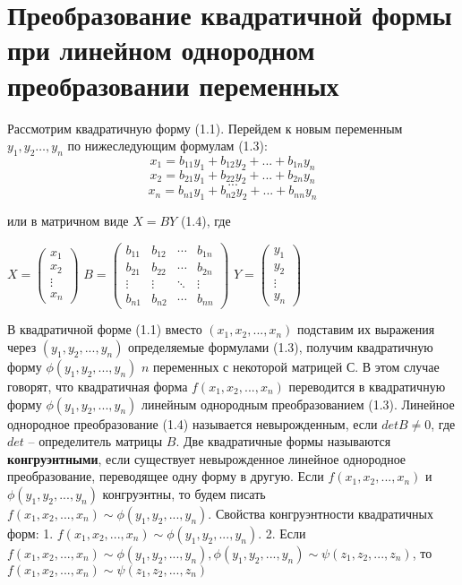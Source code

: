 \documentclass[bachelor, och, coursework, times]{SCWorks}
\newcommand\tab[1][1cm]{\hspace*{#1}}
\newcommand{\tl}{\newline\tab}
\begin{document}
\section{Преобразование квадратичной формы при линейном однородном преобразовании переменных}
\tab Рассмотрим квадратичную форму (1.1). Перейдем к новым переменным $y_1, y_2…,y_n$ по нижеследующим формулам (1.3):
$$x_1=b_{11}y_1+b_{12}y_2+...+b_{1n}y_n$$
$$x_2=b_{21}y_1+b_{22}y_2+...+b_{2n}y_n$$
$$...$$
$$x_n=b_{n1}y_1+b_{n2}y_2+...+b_{nn}y_n$$

или в матричном виде $X=BY$ (1.4), где  \newline
\begin{center}
$X = \begin{pmatrix}
x_{1}  \\
x_{2} \\        
\vdots \\
x_{n}
\end{pmatrix}$
$B = \begin{pmatrix}
b_{11} & b_{12} & \cdots & b_{1n} \\
b_{21} & b_{22} & \cdots & b_{2n} \\        
\vdots & \vdots & \ddots & \vdots \\
b_{n1} & b_{n2} & \cdots & b_{nn}
\end{pmatrix}$
$Y = \begin{pmatrix}
y_{1}  \\
y_{2} \\        
\vdots \\
y_{n}
\end{pmatrix}$
\end{center}
\tab
В квадратичной форме (1.1) вместо $(x_1, x_2,...,x_n)$ подставим их выражения через $(y_1, y_2,...,y_n)$ определяемые формулами (1.3), получим квадратичную форму $\phi (y_1, y_2,...,y_n)$ $n$ переменных с некоторой матрицей $С$. В этом случае говорят, что квадратичная форма $f(x_1, x_2,...,x_n)$ переводится в квадратичную форму $\phi(y_1, y_2,...,y_n)$ линейным однородным преобразованием (1.3). Линейное однородное преобразование (1.4) называется невырожденным, если $det B \ne 0$, где $det$ – определитель матрицы $B$.
\tl
Две квадратичные формы называются \textbf{конгруэнтными}, если существует невырожденное линейное однородное преобразование, переводящее одну форму в другую. Если $f(x_1, x_2,...,x_n)$ и $\phi(y_1, y_2,...,y_n)$ конгруэнтны, то будем писать $f(x_1, x_2,...,x_n) \sim \phi(y_1, y_2,...,y_n)$. Свойства конгруэнтности квадратичных форм:
\tl
1.  $f(x_1, x_2,...,x_n) \sim \phi(y_1, y_2,...,y_n)$.
\tl
2. Если $f(x_1, x_2,...,x_n) \sim \phi(y_1, y_2,...,y_n), \phi(y_1, y_2,...,y_n) \sim \psi(z_1,z_2,...,z_n)$, то $f(x_1, x_2,...,x_n) \sim \psi(z_1,z_2,...,z_n)$
\end{document}
